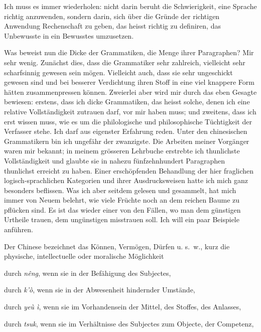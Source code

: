 \label{sp.471}

Ich muss es immer wiederholen: nicht darin beruht die Schwierigkeit, eine Sprache richtig anzuwenden, sondern darin, sich über die Gründe der richtigen Anwendung Rechenschaft zu geben, das heisst richtig zu definiren, das Unbewusste in ein Bewusstes umzusetzen.

Was beweist nun die Dicke der Grammatiken, die Menge ihrer Paragraphen? Mir sehr wenig. Zunächst dies, dass die Grammatiker sehr zahlreich, vielleicht sehr scharfsinnig gewesen sein mögen. Vielleicht auch, dass sie sehr ungeschickt gewesen sind und bei besserer Verdichtung ihren Stoff in eine viel knappere Form hätten zusammenpressen können. Zweierlei aber wird mir durch das eben Gesagte bewiesen: erstens, dass ich dicke Grammatiken, das heisst solche, denen ich eine relative Vollständigkeit zutrauen darf, vor mir haben muss; und zweitens, dass ich erst wissen muss, wie es um die philologische und philosophische Tüchtigkeit der Verfasser stehe. Ich darf aus eigenster Erfahrung reden. Unter den chinesischen Grammatikern bin ich ungefähr der zwanzigste. Die Arbeiten meiner Vorgänger waren mir bekannt; in meinem grösseren Lehrbuche erstrebte ich thunlichste Vollständigkeit und glaubte sie in nahezu fünfzehnhundert Paragraphen thunlichst erreicht zu haben. Einer erschöpfenden Behandlung der hier fraglichen logisch-sprachlichen Kategorien und ihrer Ausdrucksweisen hatte ich mich ganz besonders beflissen. Was ich aber seitdem  gelesen und gesammelt, hat mich immer von Neuem belehrt, wie viele Früchte noch an dem reichen Baume zu pflücken sind. Es ist das wieder einer von den Fällen, wo man dem günstigen Urtheile trauen, dem ungünstigen misstrauen soll. Ich will ein paar Beispiele anführen.

\largerpage[1]Der Chinese bezeichnet das Können, Vermögen, Dürfen u. s.~w., kurz die physische, intellectuelle oder moralische Möglichkeit

durch \textit{nêng}, wenn sie in der Befähigung des Subjectes,

durch \textit{k’ò}, wenn sie in der Abwesenheit hindernder Umstände,

\label{fp.453}

durch \textit{yeù ì}, wenn sie im Vorhandensein der Mittel, des Stoffes, des Anlasses,

durch \textit{tsuk}, wenn sie im Verhältnisse des Subjectes zum Objecte, der Competenz,

